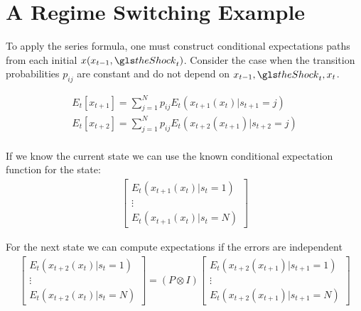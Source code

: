 \documentclass[12pt]{article}
\begin{document}






\section{A Regime Switching Example}
\label{sec:extension}
\label{sec:ressw}








\label{sec:regime-switch-model}

To apply the series formula, one must construct conditional expectations paths from each initial $x(x_{t-1},\theShock_t)$.  Consider the case when the transition 
probabilities $p_{ij}$ are constant and do not depend on 
$x_{t-1},\theShock_t,x_t$.

\begin{gather*}
E_t[x_{t+1}]=  \sum_{j=1}^{N} p_{ij} E_t(x_{t+1}(x_t)|s_{t+1}=j)  \\
E_t[x_{t+2}]=  \sum_{j=1}^{N} p_{ij} E_t(x_{t+2}(x_{t+1})|s_{t+2}=j)  \\
\end{gather*}

If we know the current state we can use the known conditional expectation function for the state:
\begin{gather*}
    \begin{bmatrix}
E_t(x_{t+1}(x_{t})|s_{t}=1)  \\    \vdots \\
E_t(x_{t+1}(x_{t})|s_{t}=N)  
  \end{bmatrix}
\end{gather*}

For the next state we can compute expectations if the errors are independent
\begin{gather*}
  \begin{bmatrix}
E_t(x_{t+2}(x_t)|s_{t}=1)  \\    \vdots \\
E_t(x_{t+2}(x_t)|s_{t}=N)  
  \end{bmatrix}=
(P \otimes  I)
  \begin{bmatrix}
E_t(x_{t+2}(x_{t+1})|s_{t+1}=1)  \\    \vdots \\
E_t(x_{t+2}(x_{t+1})|s_{t+1}=N)  
  \end{bmatrix}
\end{gather*}
\end{document}
